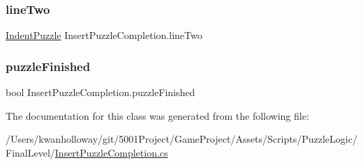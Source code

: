 \mbox{\label{class_insert_puzzle_completion_a90e3355e28d38eed7b71ab656607af65}} 
\subsubsection{\texorpdfstring{line\+Two}{lineTwo}}
{\footnotesize\ttfamily \hyperlink{class_indent_puzzle}{Indent\+Puzzle} Insert\+Puzzle\+Completion.\+line\+Two}

\mbox{\label{class_insert_puzzle_completion_a6184f335f81f3b544e6b065a9cccc084}} 
\subsubsection{\texorpdfstring{puzzle\+Finished}{puzzleFinished}}
{\footnotesize\ttfamily bool Insert\+Puzzle\+Completion.\+puzzle\+Finished}



The documentation for this class was generated from the following file\+:\begin{DoxyCompactItemize}
\item 
/\+Users/kwanholloway/git/5001\+Project/\+Game\+Project/\+Assets/\+Scripts/\+Puzzle\+Logic/\+Final\+Level/\hyperlink{_insert_puzzle_completion_8cs}{Insert\+Puzzle\+Completion.\+cs}\end{DoxyCompactItemize}
